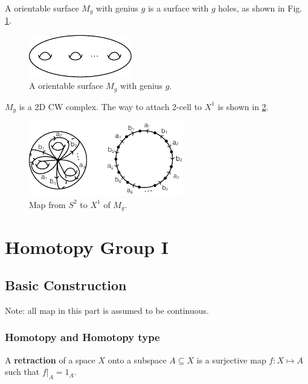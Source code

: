 \documentclass[12pt]{book}
\begin{document}
\begin{example}
	A orientable surface $M_g$ with genius $g$ is a surface with $g$ holes, as shown in Fig. \ref{fig:genus_g}.
\end{example}
\begin{figure}[htb!]
	\centering  
	\includegraphics[width=0.4\textwidth ]{resources/chap_misc/genus_g.pdf}  
	\caption{A orientable surface $M_g$ with genius $g$.}
	\label{fig:genus_g}
\end{figure}

\begin{example}
	$M_g$ is a 2D CW complex. The way to attach 2-cell to $X^1$ is shown in \ref{fig:genus_g_map}.
\end{example}
\begin{figure}[htb!]
	\centering  
	\includegraphics[width=0.6\textwidth ]{resources/chap_misc/genus_g_map.pdf}  
	\caption{Map from $S^2$ to $X^1$ of $M_g$. }
	\label{fig:genus_g_map}
\end{figure}

\part{Homotopy Group I}

\chapter{Basic Construction}

Note: all map in this part is assumed to be continuous.

\section{Homotopy and Homotopy type}

\begin{definition}
	A {\bf retraction} of a space $X$ onto a subspace $A\subseteq X$ is a surjective map $f:X\mapsto A$ such that $f|_A=1_A$.
\end{definition} 
\end{document}
